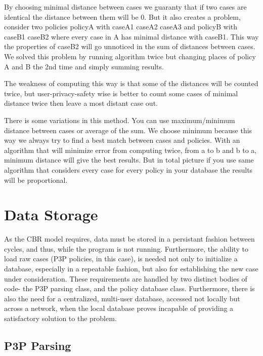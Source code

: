 By choosing minimal distance between cases we guaranty that if two cases are identical the distance between them will be 0. But it also creates a problem, consider two policies policyA with {caseA1 caseA2 caseA3} and policyB with {caseB1 caseB2} where every case in A has minimal distance with caseB1. This way the properties of caseB2 will go unnoticed in the sum of distances between cases. We solved this problem by running algorithm twice but changing places of policy A and B the 2nd time and simply summing results.

The weakness of computing this way is that some of the distances will be counted twice, but user-privacy-safety wise is better to count some cases of minimal distance twice then leave a most distant case out.

There is some variations in this method. You can use maximum/minimum distance between cases or average of the sum. We choose minimum because this way we always try to find a best match between cases and policies. With an algorithm that will minimize error from computing twice, from a to b and b to a, minimum distance will give the best results. But in total picture if you use same algorithm that considers every case for every policy in your database the results will be proportional.




\section{Data Storage}
As the CBR model requires, data must be stored in a persistant fashion between cycles, and thus, while the program is not running. Furthermore, the ability to load raw cases (P3P policies, in this case), is needed not only to initialize a database, especially in a repeatable fashion, but also for establishing the new case under consideration. These requirements are handled by two distinct bodies of code- the P3P parsing class, and the policy database class. Furthermore, there is also the need for a centralized, multi-user database, accessed not locally but across a network, when the local database proves incapable of providing a satisfactory solution to the problem.

\subsection{P3P Parsing}  %

